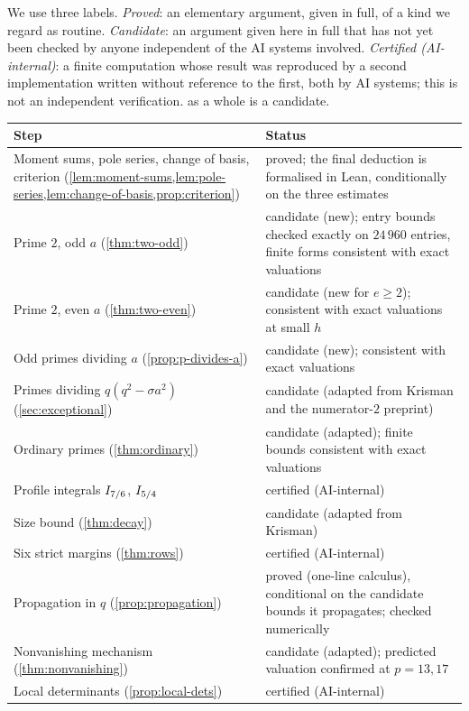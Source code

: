 We use three labels. \emph{Proved}: an elementary argument, given in full, of a kind we regard
as routine. \emph{Candidate}: an argument given here in full that has not yet been checked by
anyone independent of the AI systems involved. \emph{Certified (AI-internal)}: a finite
computation whose result was reproduced by a second implementation written without reference to
the first, both by AI systems; this is not an independent verification.  as a
whole is a candidate.
\begin{center}
\small
\begin{tabular}{@{}p{}p{}@{}}
\toprule
Step & Status\\
\midrule
Moment sums, pole series, change of basis, criterion
(\cref{lem:moment-sums,lem:pole-series,lem:change-of-basis,prop:criterion}) & proved; the final
deduction is formalised in Lean, conditionally on the three estimates\\
Prime $2$, odd $a$ (\cref{thm:two-odd}) & candidate (new); entry bounds checked exactly on
$24\,960$ entries, finite forms consistent with exact valuations\\
Prime $2$, even $a$ (\cref{thm:two-even}) & candidate (new for $e\ge2$); consistent with exact
valuations at small $h$\\
Odd primes dividing $a$ (\cref{prop:p-divides-a}) & candidate (new); consistent with exact
valuations\\
Primes dividing $q(q^2-\sigma a^2)$ (\cref{sec:exceptional}) & candidate (adapted from Krisman and
the numerator-$2$ preprint)\\
Ordinary primes (\cref{thm:ordinary}) & candidate (adapted); finite bounds consistent with exact
valuations\\
Profile integrals $I_{7/6}$, $I_{5/4}$ & certified (AI-internal)\\
Size bound (\cref{thm:decay}) & candidate (adapted from Krisman)\\
Six strict margins (\cref{thm:rows}) & certified (AI-internal)\\
Propagation in $q$ (\cref{prop:propagation}) & proved (one-line calculus), conditional on the
candidate bounds it propagates; checked numerically\\
Nonvanishing mechanism (\cref{thm:nonvanishing}) & candidate (adapted); predicted valuation
confirmed at $p=13,17$\\
Local determinants (\cref{prop:local-dets}) & certified (AI-internal)\\
\bottomrule
\end{tabular}
\end{center}

